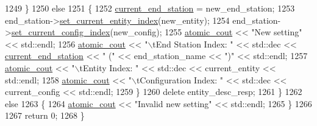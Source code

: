 \begin{DoxyCode}
1249         \}
1250         \textcolor{keywordflow}{else}
1251         \{
1252             \hyperlink{classcmd__line_a67c43393f654ad7bc5c7caf29634cede}{current\_end\_station} = new\_end\_station;
1253             end\_station->\hyperlink{classavdecc__lib_1_1end__station_ac5076f06b60c9882e2f278d6983122b5}{set\_current\_entity\_index}(new\_entity);
1254             end\_station->\hyperlink{classavdecc__lib_1_1end__station_ae9080ba4b1349938540001fc49cb39b0}{set\_current\_config\_index}(new\_config);
1255             \hyperlink{cmd__line_8h_a0bc38ccc65c79ba06c6fcd7b4bf554c3}{atomic\_cout} << \textcolor{stringliteral}{"New setting"} << std::endl;
1256             \hyperlink{cmd__line_8h_a0bc38ccc65c79ba06c6fcd7b4bf554c3}{atomic\_cout} << \textcolor{stringliteral}{"\(\backslash\)tEnd Station Index: "} << std::dec << 
      \hyperlink{classcmd__line_a67c43393f654ad7bc5c7caf29634cede}{current\_end\_station} << \textcolor{stringliteral}{" ("} << end\_station\_name << \textcolor{stringliteral}{")"} << std::endl;
1257             \hyperlink{cmd__line_8h_a0bc38ccc65c79ba06c6fcd7b4bf554c3}{atomic\_cout} << \textcolor{stringliteral}{"\(\backslash\)tEntity Index: "} << std::dec << current\_entity << std::endl;
1258             \hyperlink{cmd__line_8h_a0bc38ccc65c79ba06c6fcd7b4bf554c3}{atomic\_cout} << \textcolor{stringliteral}{"\(\backslash\)tConfiguration Index: "} << std::dec << current\_config << std::endl;
1259         \}
1260         \textcolor{keyword}{delete} entity\_desc\_resp;
1261     \}
1262     \textcolor{keywordflow}{else}
1263     \{
1264         \hyperlink{cmd__line_8h_a0bc38ccc65c79ba06c6fcd7b4bf554c3}{atomic\_cout} << \textcolor{stringliteral}{"Invalid new setting"} << std::endl;
1265     \}
1266 
1267     \textcolor{keywordflow}{return} 0;
1268 \}
\end{DoxyCode}


